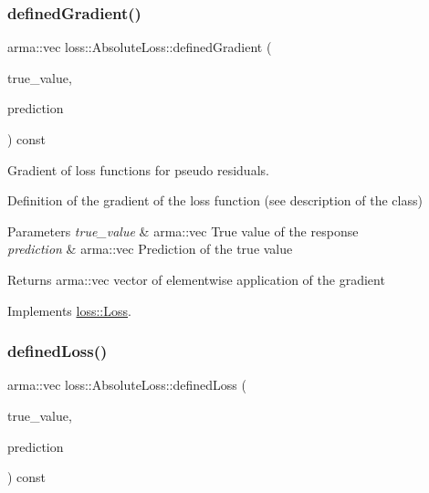 \mbox{\label{classloss_1_1_absolute_loss_a1886fc8ca065c6f0a207b7a8a0f8444d}} 
\subsubsection{\texorpdfstring{defined\+Gradient()}{definedGradient()}}
{\footnotesize\ttfamily arma\+::vec loss\+::\+Absolute\+Loss\+::defined\+Gradient (\begin{DoxyParamCaption}\item[{const arma\+::vec \&}]{true\+\_\+value,  }\item[{const arma\+::vec \&}]{prediction }\end{DoxyParamCaption}) const\hspace{0.3cm}{\ttfamily [virtual]}}



Gradient of loss functions for pseudo residuals. 

Definition of the gradient of the loss function (see description of the class)


\begin{DoxyParams}{Parameters}
{\em true\+\_\+value} & {\ttfamily arma\+::vec} True value of the response \\
\hline
{\em prediction} & {\ttfamily arma\+::vec} Prediction of the true value\\
\hline
\end{DoxyParams}
\begin{DoxyReturn}{Returns}
{\ttfamily arma\+::vec} vector of elementwise application of the gradient 
\end{DoxyReturn}


Implements \hyperlink{classloss_1_1_loss_a267a4de70747ade4b2d84ce35a448979}{loss\+::\+Loss}.

\mbox{\label{classloss_1_1_absolute_loss_acfef6f0de3cfcccebd4bbfc04133cf1e}} 
\subsubsection{\texorpdfstring{defined\+Loss()}{definedLoss()}}
{\footnotesize\ttfamily arma\+::vec loss\+::\+Absolute\+Loss\+::defined\+Loss (\begin{DoxyParamCaption}\item[{const arma\+::vec \&}]{true\+\_\+value,  }\item[{const arma\+::vec \&}]{prediction }\end{DoxyParamCaption}) const\hspace{0.3cm}{\ttfamily [virtual]}}



